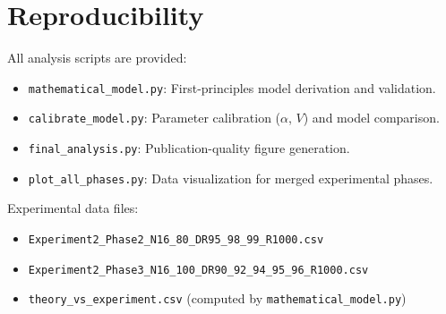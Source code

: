 \documentclass[12pt,a4paper]{article}
\begin{document}
\section{Reproducibility}

All analysis scripts are provided:
\begin{itemize}
  \item \texttt{mathematical\_model.py}: First-principles model derivation and validation.
  \item \texttt{calibrate\_model.py}: Parameter calibration ($\alpha$, $V$) and model comparison.
  \item \texttt{final\_analysis.py}: Publication-quality figure generation.
  \item \texttt{plot\_all\_phases.py}: Data visualization for merged experimental phases.
\end{itemize}

Experimental data files:
\begin{itemize}
  \item \texttt{Experiment2\_Phase2\_N16\_80\_DR95\_98\_99\_R1000.csv}
  \item \texttt{Experiment2\_Phase3\_N16\_100\_DR90\_92\_94\_95\_96\_R1000.csv}
  \item \texttt{theory\_vs\_experiment.csv} (computed by \texttt{mathematical\_model.py})
\end{itemize}
\end{document}

